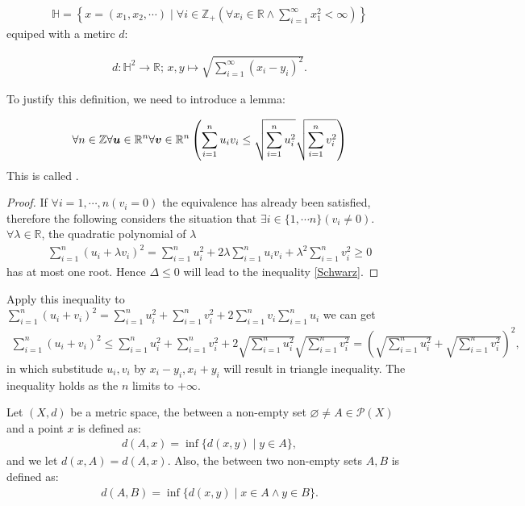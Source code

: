\documentclass[openany]{book}
\begin{document}
\begin{align}
	\mathbb{H}=\left\{ 
		x=(x_1,x_2,\cdots) \mid \forall i\in \mathbb{Z}_+\left( 
			\forall x_i\in \mathbb{R}\wedge \sum^\infty_{i=1} x_1^2 < \infty\right)\right\}
\end{align}
equiped with a metirc $d$:

\begin{align}
	d\colon \mathbb{H}^2\to \mathbb{R}; \,x,y\mapsto \sqrt {\sum^\infty_{i=1} (x_i-y_i)^2 }.
\end{align}

To justify this definition, we need to introduce a lemma:
\begin{lemma}\label{Schwarz_inequality}
\begin{align}\label{Schwarz}
	\forall n\in\mathbb{Z}\forall \boldsymbol{u}\in\mathbb{R}^n\forall \boldsymbol{v}\in\mathbb{R}^n\left(
		\sum^n_{i=1} u_iv_i \leq \sqrt{ \sum^n_{i=1} u_i^2}\sqrt{ \sum^n_{i=1} v_i^2}\right)
\end{align}
This is called .
\end{lemma}
\begin{proof}
If $\forall i=1,\cdots,n ( v_i=0)$ the equivalence has already been satisfied, therefore the following considers the situation that $\exists i\in \{1,\cdots n\}( v_i\neq 0)$. $\forall \lambda \in\mathbb R$, the quadratic polynomial of $\lambda$
\begin{align*}
	\sum ^n_{i=1} (u_i+\lambda v_i)^2 = 
		\sum ^n_{i=1} u_i^2 +2\lambda \sum ^n_{i=1} u_iv_i + \lambda^2 \sum ^n_{i=1} v_i^2 \geq 0
\end{align*}
has at most one root. Hence $\Delta \leq 0$ will lead to the inequality \ref{Schwarz}.
\end{proof}

Apply this inequality to $\sum ^n_{i=1} ( u_i+v_i)^2 = 
	\sum ^n_{i=1} u_i^2 +\sum ^n_{i=1}  v_i^2 +2\sum ^n_{i=1}  v_i\sum ^n_{i=1} u_i$ we can get
\begin{align*}
	\sum ^n_{i=1} ( u_i+v_i)^2 \leq 
		\sum ^n_{i=1} u_i^2 +\sum ^n_{i=1}  v_i^2 +
			2\sqrt{ \sum^n_{i=1} u_i^2}\sqrt{ \sum^n_{i=1} v_i^2} = \left(
				\sqrt{ \sum^n_{i=1} u_i^2}+\sqrt{ \sum^n_{i=1} v_i^2} \right)^2 ,
\end{align*}
in which substitude $u_i,v_i$ by $x_i-y_i, x_i+y_i$ will result in triangle inequality. The inequality holds as the $n$ limits to $+\infty$.

\begin{definition}
Let $(X,d)$ be a metric space, the  between a non-empty set $\varnothing\neq A\in \mathscr P(X)$ and a point $x$ is defined as:
\begin{align*}
	d(A,x) = \inf \{d(x,y)\mid y\in A\},
\end{align*}
and we let $d(x,A) = d(A,x)$. 
Also, the  between two non-empty sets $A,B$ is defined as:
\begin{align*}
	d(A,B) = \inf \{d(x,y)\mid x\in A\wedge y\in B\}.
\end{align*}
\end{definition}
\end{document}
